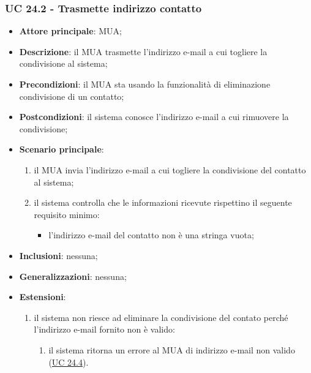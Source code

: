     \subsubsection{UC 24.2 - Trasmette indirizzo contatto} \label{sec:UC24.2}
    \begin{itemize}
        \item \textbf{Attore principale}: MUA;
        \item \textbf{Descrizione}: il MUA trasmette l'indirizzo e-mail a cui togliere la condivisione al sistema;
        \item \textbf{Precondizioni}: il MUA sta usando la funzionalità di eliminazione condivisione di un contatto;
        \item \textbf{Postcondizioni}: il sistema conosce l'indirizzo e-mail a cui rimuovere la condivisione;
        \item \textbf{Scenario principale}:
            \begin{enumerate}
                \item il MUA invia l'indirizzo e-mail a cui togliere la condivisione del contatto al sistema;
                \item il sistema controlla che le informazioni ricevute rispettino il seguente requisito minimo:
                    \begin{itemize}
                        \item l'indirizzo e-mail del contatto non è una stringa vuota;
                    \end{itemize}
            \end{enumerate}
        \item \textbf{Inclusioni}: nessuna;
        \item \textbf{Generalizzazioni}: nessuna;
        \item \textbf{Estensioni}:
            \begin{enumerate}[label=\alph*.]
                \item il sistema non riesce ad eliminare la condivisione del contato perché l'indirizzo e-mail fornito non è valido:
                \begin{enumerate}[label=\arabic*.]
                    \item il sistema ritorna un errore al MUA di indirizzo e-mail non valido (\hyperref[sec:UC24.4]{UC 24.4}).
                \end{enumerate}
            \end{enumerate}
    \end{itemize}


